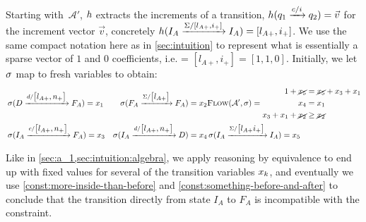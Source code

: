 Starting with~$\mathcal{A}'$, $h$ extracts the increments of a transition, $h(q_1 \xrightarrow{c / i} q_2) = \Vec{v}$ for the increment
vector $\Vec{v}$, concretely $h(I_A \xrightarrow{\Sigma / \left[ l_{A+}, i_+
\right]} I_A) = \left[ l_{A+}, i_+ \right]$. We use the same compact notation
here as in \cref{sec:intuition} to represent what is essentially a sparse vector
of $1$ and $0$ coefficients, i.e. = $\left[ l_{A+}, i_+ \right] = \left[1, 1,
0\right]$. Initially, we let $\operatorname{\sigma}$ map to fresh variables to obtain:
\begin{equation}\label{eq:single-filter}
    \begin{aligned}
      & \operatorname{\sigma}(D \xrightarrow{d/\begin{bmatrix}l_{A+}, n_+\end{bmatrix}} F_A) = x_1
        & \operatorname{\sigma}(F_A \xrightarrow{\Sigma/\begin{bmatrix} l_{A+} \end{bmatrix}} F_A ) = x_2   
        & \textsc{Flow}(\mathcal{A}', \operatorname{\sigma})  = \begin{aligned}
                       1 + \cancel{x_5} &= \cancel{x_5} + x_3 + x_1\\
                    x_4 &= x_1 \\
                    x_3 + x_1 + \cancel{x_2} &\geq \cancel{x_2}  \\
                    \end{aligned} \\
      &\operatorname{\sigma}(I_A \xrightarrow{c/\begin{bmatrix}l_{A+}, n_+\end{bmatrix}} F_A ) =  x_3 
          & \operatorname{\sigma}(I_A \xrightarrow{d/\begin{bmatrix}l_{A+}, n_+\end{bmatrix}} D) = x_4
          & \operatorname{\sigma}(I_A \xrightarrow{\Sigma/\begin{bmatrix} l_{A+} i_+\end{bmatrix}} I_A) = x_5  
    \end{aligned}
\end{equation}

Like in \cref{sec:a_1,sec:intuition:algebra}, we apply reasoning by equivalence
  to end up with fixed values for several of the transition variables
  $x_k$, and eventually we use \cref{const:more-inside-than-before}
  and \cref{const:something-before-and-after} to conclude that the transition
  directly from state $I_{A}$ to $F_{A}$ is incompatible with the constraint.

